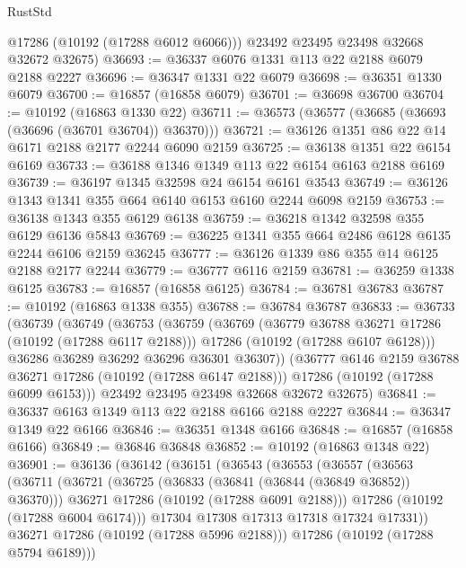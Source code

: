 \begin{lexlean}{RustStd}
\begin{coremodule}
        @17286
        (@10192 (@17288 @6012 @6066)))
      @23492
      @23495
      @23498
      @32668
      @32672
      @32675)
@36693 := @36337 @6076 @1331 @113 @22 @2188 @6079 @2188 @2227
@36696 := @36347 @1331 @22 @6079
@36698 := @36351 @1330 @6079
@36700 := @16857 (@16858 @6079)
@36701 := @36698 @36700
@36704 := @10192 (@16863 @1330 @22)
@36711 := @36573 (@36577 (@36685 (@36693 (@36696 (@36701 @36704)) @36370)))
@36721 := @36126 @1351 @86 @22 @14 @6171 @2188 @2177 @2244 @6090 @2159
@36725 := @36138 @1351 @22 @6154 @6169
@36733 := @36188 @1346 @1349 @113 @22 @6154 @6163 @2188 @6169
@36739 := @36197 @1345 @32598 @24 @6154 @6161 @3543
@36749 := @36126 @1343 @1341 @355 @664 @6140 @6153 @6160 @2244 @6098 @2159
@36753 := @36138 @1343 @355 @6129 @6138
@36759 := @36218 @1342 @32598 @355 @6129 @6136 @5843
@36769 := @36225 @1341 @355 @664 @2486 @6128 @6135 @2244 @6106 @2159 @36245
@36777 := @36126 @1339 @86 @355 @14 @6125 @2188 @2177 @2244
@36779 := @36777 @6116 @2159
@36781 := @36259 @1338 @6125
@36783 := @16857 (@16858 @6125)
@36784 := @36781 @36783
@36787 := @10192 (@16863 @1338 @355)
@36788 := @36784 @36787
@36833 := @36733
    (@36739
      (@36749
        (@36753
          (@36759
            (@36769
              (@36779 @36788 @36271 @17286 (@10192 (@17288 @6117 @2188)))
              @17286
              (@10192 (@17288 @6107 @6128)))
            @36286
            @36289
            @36292
            @36296
            @36301
            @36307))
        (@36777 @6146 @2159 @36788 @36271 @17286 (@10192 (@17288 @6147 @2188)))
        @17286
        (@10192 (@17288 @6099 @6153)))
      @23492
      @23495
      @23498
      @32668
      @32672
      @32675)
@36841 := @36337 @6163 @1349 @113 @22 @2188 @6166 @2188 @2227
@36844 := @36347 @1349 @22 @6166
@36846 := @36351 @1348 @6166
@36848 := @16857 (@16858 @6166)
@36849 := @36846 @36848
@36852 := @10192 (@16863 @1348 @22)
@36901 := @36136
    (@36142
      (@36151
        (@36543
          (@36553
            (@36557
              (@36563
                (@36711
                  (@36721
                    (@36725 (@36833 (@36841 (@36844 (@36849 @36852)) @36370)))
                    @36271
                    @17286
                    (@10192 (@17288 @6091 @2188)))
                  @17286
                  (@10192 (@17288 @6004 @6174)))
                @17304
                @17308
                @17313
                @17318
                @17324
                @17331))
            @36271
            @17286
            (@10192 (@17288 @5996 @2188)))
          @17286
          (@10192 (@17288 @5794 @6189)))

\end{coremodule}
\end{lexlean}
